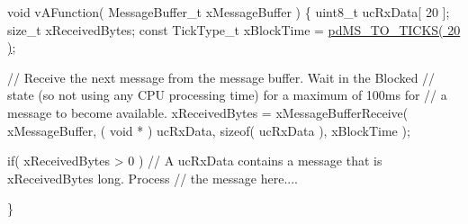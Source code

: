 \begin{DoxyPre}
void vAFunction( MessageBuffer\_t xMessageBuffer )
\{
uint8\_t ucRxData[ 20 ];
size\_t xReceivedBytes;
const TickType\_t xBlockTime = \hyperlink{projdefs_8h_a353d0f62b82a402cb3db63706c81ec3f}{pdMS\_TO\_TICKS( 20 )};
\begin{DoxyVerb}// Receive the next message from the message buffer.  Wait in the Blocked
// state (so not using any CPU processing time) for a maximum of 100ms for
// a message to become available.
xReceivedBytes = xMessageBufferReceive( xMessageBuffer,
                                        ( void * ) ucRxData,
                                        sizeof( ucRxData ),
                                        xBlockTime );

if( xReceivedBytes > 0 )
{
    // A ucRxData contains a message that is xReceivedBytes long.  Process
    // the message here....
}
\end{DoxyVerb}

\}
\end{DoxyPre}
 